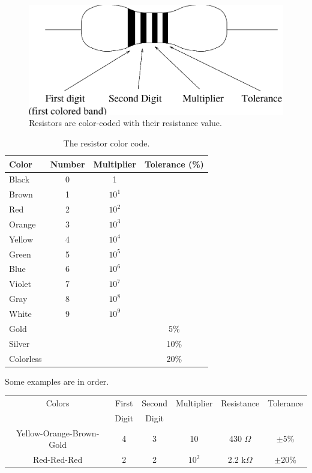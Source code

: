 \begin{figure}[!htb]
\centering \epsfxsize=9cm \includegraphics[scale=0.6]{2_dc/resistor.eps}
\caption{Resistors are color-coded with their resistance value.}
\label{fig:DC:colorcode}
\end{figure}
\begin{table}[htb]
\begin{center}
\begin{tabular}{|l|c|c|c|}
\hline
Color & Number & Multiplier & Tolerance (\%) \\
\hline
Black     & 0 & 1      &      \\
Brown     & 1 & $10^1$ &      \\
Red       & 2 & $10^2$ &      \\
Orange    & 3 & $10^3$ &      \\
Yellow    & 4 & $10^4$ &      \\
Green     & 5 & $10^5$ &      \\
Blue      & 6 & $10^6$ &      \\
Violet    & 7 & $10^7$ &      \\
Gray      & 8 & $10^8$ &      \\
White     & 9 & $10^9$ &      \\
Gold      &   &        & 5\%  \\
Silver    &   &        & 10\% \\
Colorless &   &        & 20\% \\
\hline
\end{tabular}
\end{center}
\caption{The resistor color code.}
\label{tab:DC:colorcode}
\end{table}

Some examples are in order.\\
\begin{tabular}{cccccc}
Colors & First & Second & Multiplier & Resistance & Tolerance \\
& Digit & Digit & & & \\
Yellow-Orange-Brown-Gold & 4 & 3 & 10 & 430  $\Omega$ & $\pm 5$\%  \\
Red-Red-Red   & 2 & 2 & $10^2$ & 2.2 k$\Omega$ & $\pm 20$\% 
\end{tabular}

